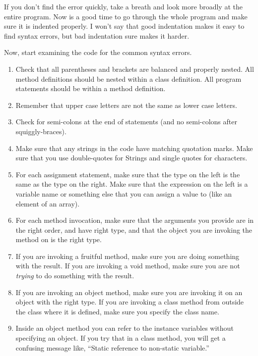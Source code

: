 \documentclass{book}
\begin{document}
If you don't find the error quickly, take a breath and look more
broadly at the entire program.  Now is a good time to go through the
whole program and make sure it is indented properly.  I won't say that
good indentation makes it easy to find syntax errors, but bad
indentation sure makes it harder.

Now, start examining the code for the common syntax errors.

\begin{enumerate}

\item Check that all parentheses and brackets are
balanced and properly nested.  All method definitions should be nested
within a class definition.  All program statements should be within a
method definition.

\item Remember that upper case letters are not the same as
lower case letters.

\item Check for semi-colons at the end of statements (and
no semi-colons after squiggly-braces).

\item Make sure that any strings in the code have matching
quotation marks.  Make sure that you use double-quotes for
Strings and single quotes for characters.

\item For each assignment statement, make sure that the type
on the left is the same as the type on the right.  Make sure
that the expression on the left is a variable name or something
else that you can assign a value to (like an element of an array).

\item For each method invocation, make sure that the arguments
you provide are in the right order, and have right type, and that the
object you are invoking the method on is the right type.

\item If you are invoking a fruitful method, make sure you
are doing something with the result.  If you are invoking a
void method, make sure you are not {\em trying} to do something
with the result.

\item If you are invoking an object method, make sure you are
invoking it on an object with the right type.  If you are invoking
a class method from outside the class where it is defined, make
sure you specify the class name.

\item Inside an object method you can refer to the instance
variables without specifying an object.  If you try that in
a class method, you will get a confusing message like, ``Static
reference to non-static variable.''

\end{enumerate}
\end{document}
